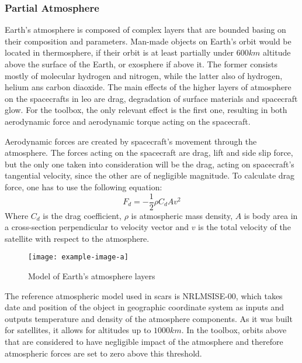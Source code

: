         \subsubsection{Partial Atmosphere}\label{toolbox:atmosphere}
            Earth's atmosphere is composed of complex layers that are bounded basing on their composition and parameters. Man-made objects on Earth's orbit would be located in thermosphere, if their orbit is at least partially under $600km$ altitude above the surface of the Earth, or exosphere if above it. The former consists mostly of molecular hydrogen and nitrogen, while the latter also of hydrogen, helium ans carbon diaoxide. The main effects of the higher layers of atmosphere on the spacecrafts in \ac{leo} are drag, degradation of surface materials and spacecraft glow. For the toolbox, the only relevant effect is the first one, resulting in both aerodynamic force and aerodynamic torque acting on the spacecraft.

            Aerodynamic forces are created by spacecraft's movement through the atmosphere. The forces acting on the spacecraft are drag, lift and side slip force, but the only one taken into consideration will be the drag, acting on spacecraft's tangential velocity, since the other are of negligible magnitude. To calculate drag force, one has to use the following equation:
            \begin{equation}
                F_d = -\frac{1}{2}\rho C_d A v^2
            \end{equation}
            Where $C_d$ is the drag coefficient, $\rho$ is atmospheric mass density, $A$ is body area in a cross-section perpendicular to velocity vector and $v$ is the total velocity of the satellite with respect to the atmosphere. 


            \begin{figure}[H]
                \centering
                \texttt{[image: example-image-a]}
                \caption{Model of Earth's atmosphere layers}
                \label{fig:atmosphere}
            \end{figure}

            The reference atmospheric model used in \ac{scars} is NRLMSISE-00, which takes date and position of the object in geographic coordinate system as inputs and outputs temperature and density of the atmosphere components. As it was built for satellites, it allows for altitudes up to $1000km$. In the toolbox, orbits above that are considered to have negligible impact of the atmosphere and therefore atmospheric forces are set to zero above this threshold.

